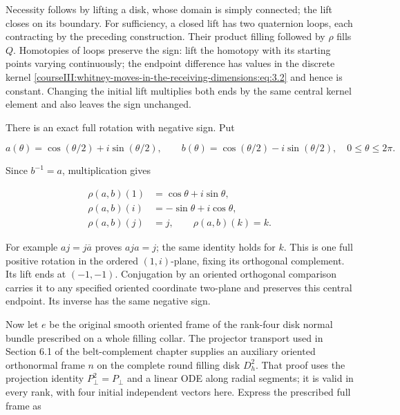 Necessity follows by lifting a disk, whose domain is simply connected; the lift closes on its boundary. For sufficiency, a closed lift has two quaternion loops, each contracting by the preceding construction. Their product filling followed by \(\rho\) fills \(Q\). Homotopies of loops preserve the sign: lift the homotopy with its starting points varying continuously; the endpoint difference has values in the discrete kernel \eqref{courseIII:whitney-moves-in-the-receiving-dimensions:eq:3.2} and hence is constant. Changing the initial lift multiplies both ends by the same central kernel element and also leaves the sign unchanged.

There is an exact full rotation with negative sign. Put

\begin{equation}
a(\theta)=\cos(\theta/2)+i\sin(\theta/2),\qquad
 b(\theta)=\cos(\theta/2)-i\sin(\theta/2),
 \quad 0\leq\theta\leq2\pi.
 \label{courseIII:whitney-moves-in-the-receiving-dimensions:eq:3.4}
\end{equation}

Since \(b^{-1}=a\), multiplication gives

\begin{equation}
\begin{aligned}
 \rho(a,b)(1)&=\cos\theta+i\sin\theta,\\
 \rho(a,b)(i)&=-\sin\theta+i\cos\theta,\\
 \rho(a,b)(j)&=j,\qquad \rho(a,b)(k)=k .
 \end{aligned}
 \label{courseIII:whitney-moves-in-the-receiving-dimensions:eq:3.5}
\end{equation}

For example \(a j=j\overline a\) proves \(a j a=j\); the same identity holds for \(k\). This is one full positive rotation in the ordered \((1,i)\)-plane, fixing its orthogonal complement. Its lift ends at \((-1,-1)\). Conjugation by an oriented orthogonal comparison carries it to any specified oriented coordinate two-plane and preserves this central endpoint. Its inverse has the same negative sign.

Now let \(e\) be the original smooth oriented frame of the rank-four disk normal bundle prescribed on a whole filling collar. The projector transport used in Section 6.1 of the belt-complement chapter supplies an auxiliary oriented orthonormal frame \(n\) on the complete round filling disk \(D_h^2\). That proof uses the projection identity \(P_\perp^2=P_\perp\) and a linear ODE along radial segments; it is valid in every rank, with four initial independent vectors here. Express the prescribed full frame as

